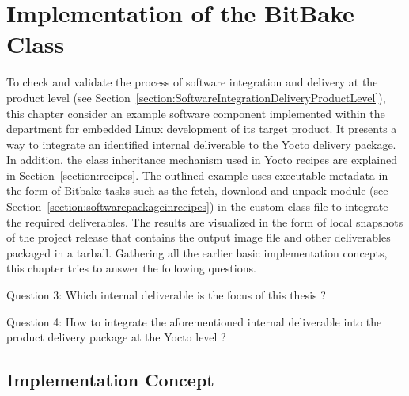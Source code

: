 
\chapter{Implementation of the BitBake Class} %

\label{Chapter 6} %

To check and validate the process of software integration and delivery at the product level (see Section~\ref{section:SoftwareIntegrationDeliveryProductLevel}), this chapter consider an example software component implemented within the department for embedded Linux development of its target product. It presents a way to integrate an identified internal deliverable to the Yocto delivery package. In addition, the class inheritance mechanism used in Yocto recipes are explained in Section~\ref{section:recipes}. The outlined example uses executable metadata in the form of Bitbake tasks such as the fetch, download and unpack module (see Section~\ref{section:softwarepackageinrecipes}) in the custom class file to integrate the required deliverables. The results are visualized in the form of local snapshots of the project release that contains the output image file and other deliverables packaged in a tarball. Gathering all the earlier basic implementation concepts, this chapter tries to answer the following questions.
\vspace{0.2cm}

\noindent Question 3: Which internal deliverable is the focus of this thesis ?




\vspace{0.2cm}
\noindent Question 4:  How to integrate the aforementioned internal deliverable into the product delivery package at the Yocto level ?
\vspace{0.2cm}

\section{Implementation Concept} \label{section:implementationapproach}

